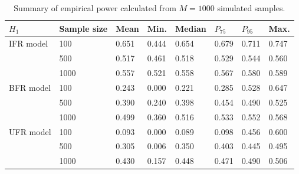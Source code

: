 \documentclass[preprint,12pt]{elsarticle}
\begin{document}
\begin{table}[htb]
\centering
\caption{Summary of empirical power calculated from $M=1000$ simulated samples.}
{\begin{tabular}{llllllll}
  $H_1$        &Sample size &   Mean & Min.   & Median   & $P_{75}$ & $P_{95}$& Max.\\
\hline
IFR model &100       & 0.651& 0.444 & 0.654 &0.679  & 0.711 & 0.747\\
          &500       & 0.517& 0.461 & 0.518 & 0.529 & 0.544 &0.560\\
          &1000      & 0.557& 0.521 & 0.558 & 0.567 & 0.580 &0.589\\ \hline
BFR model &100       & 0.243& 0.000 & 0.221 & 0.285 & 0.528 & 0.647\\
          &500       & 0.390& 0.240 & 0.398 & 0.454 & 0.490 & 0.525\\
          &1000      &0.499 &0.360  &0.516  & 0.533 & 0.552 &0.568\\ \hline
UFR model &100       &0.093 &0.000  &0.089  &0.098  & 0.456 &0.600 \\
          &500       &0.305&0.006  &0.350  & 0.403 &0.445  &0.495\\
          &1000      &0.430 &0.157  &0.448  &0.471  &0.490  &0.506\\ \hline

\end{tabular}}
\label{Tab:power}
\end{table}



\end{document}
